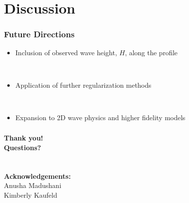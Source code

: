 \documentclass[7pt]{beamer}
\begin{document}
\section{Discussion}

\begin{frame}
	\frametitle{Future Directions}
		\begin{itemize}
			 \item Inclusion of observed wave height, $H$, along the profile
		\end{itemize}
		$\,$\\
		\begin{itemize}
			 \item Application of further regularization methods
		\end{itemize}
		$\,$\\
		\begin{itemize}
			 \item Expansion to 2D wave physics and higher fidelity models
		\end{itemize}
\end{frame}

\begin{frame}
	\frametitle{}
		\hspace{2.5cm}
		\begin{minipage}{50mm}   
                 	\begin{alertblock}{}    
                        		 \begin{center}
                  			\textbf{Thank you! \\Questions?}\\
					$\,$\\
					$\,$\\
				\textbf{Acknowledgements:}\\
					Anusha Madushani\\
					Kimberly Kaufeld
				\end{center}
      			\end{alertblock}
		\end{minipage}
\end{frame}
\end{document}
